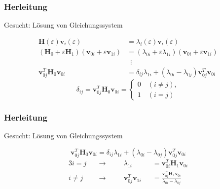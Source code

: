 \documentclass[ngerman, aspectratio=169]{beamer}
\begin{document}
	\begin{frame}
        \frametitle{Herleitung}

        \begin{block}{Gesucht: Lösung von Gleichungssystem}

			\begin{align}
				\bm H(\varepsilon) \bm v_i(\varepsilon) &= \lambda_i(\varepsilon) \bm v_i(\varepsilon) \\
				(\bm H_0 + \varepsilon \bm H_1)
				(\bm v_{0i} + \varepsilon \bm v_{1i})
				&=
				(\lambda_{0i} + \varepsilon \lambda_{1i})
				(\bm v_{0i} + \varepsilon \bm v_{1i}) \\
				& \phantom{2} \vdots \nonumber\\
				\bm v_{0j}^T \bm H_0 \bm v_{0i}
				&=
				\delta_{ij} \lambda_{1i} + 
				( \lambda_{0i} - \lambda_{0j} )
				\bm v_{0j}^T  \bm v_{0i}
			\end{align}
			\begin{equation*}
				\delta_{ij} = \bm v_{0j}^T \bm H_0 \bm v_{0i}
				= \begin{cases}
					0 \quad (i \neq j),\\
					1 \quad (i = j)
					\end{cases}
			\end{equation*}
        \end{block}

	\end{frame}

	\begin{frame}
        \frametitle{Herleitung}

        \begin{block}{Gesucht: Lösung von Gleichungssystem}

			\begin{equation*}
				\bm v_{0j}^T \bm H_0 \bm v_{0i}
				=
				\delta_{ij} \lambda_{1i} + 
				( \lambda_{0i} - \lambda_{0j} )
				\bm v_{0j}^T  \bm v_{0i}
			\end{equation*}
			\begin{alignat*}{3}
				i = j \quad & \rightarrow  \quad && \lambda_{1i}&& = \bm v_{0i}^T \bm H_1 \bm v_{0i} \\
				i \neq j \quad & \rightarrow \quad && \bm v_{0j}^T \bm v_{1i}&& = \frac{\bm v_{0j}^T \bm H_1 \bm v_{0i}}{\lambda_{0i} - \lambda_{0j}}
			\end{alignat*}
        \end{block}
	\end{frame}
\end{document}
